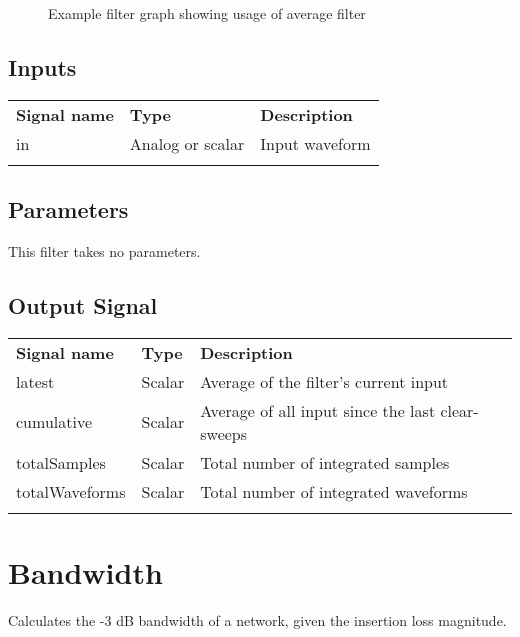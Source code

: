 \begin{figure}[h]
\centering
{}
\caption{Example filter graph showing usage of average filter}
\label{filter_graph_average}
\end{figure}
\FloatBarrier

\subsection{Inputs}
\begin{tabularx}{16cm}{llX}
\thickhline
\textbf{Signal name} & \textbf{Type} & \textbf{Description} \\
\thickhline
in & Analog or scalar & Input waveform \\
\thickhline
\end{tabularx}

\subsection{Parameters}

This filter takes no parameters.

\subsection{Output Signal}

\begin{tabularx}{16cm}{llX}
\thickhline
\textbf{Signal name} & \textbf{Type} & \textbf{Description} \\
\thickhline
latest & Scalar & Average of the filter's current input \\
\thinhline
cumulative & Scalar & Average of all input since the last clear-sweeps\\
\thinhline
totalSamples & Scalar & Total number of integrated samples \\
\thinhline
totalWaveforms & Scalar & Total number of integrated waveforms \\
\thickhline
\end{tabularx}

\pagebreak
\section{Bandwidth}

Calculates the -3 dB bandwidth of a network, given the insertion loss magnitude.

